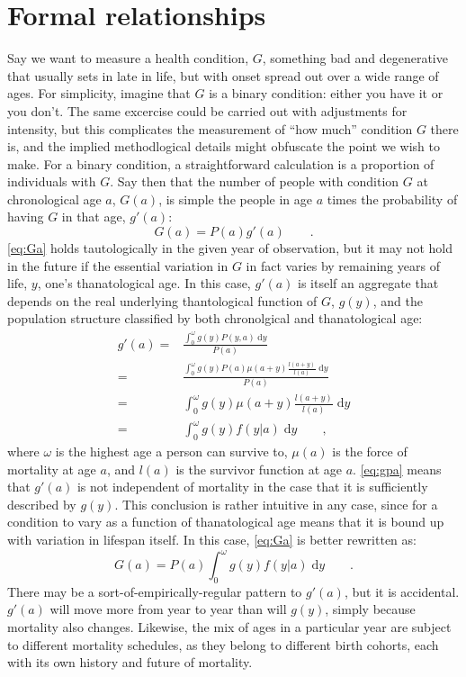 \documentclass[11pt,oneside,a4paper]{article} %
\newcommand{\dd}{\; \mathrm{d}}
\newcommand{\tc}{\quad\quad\text{,}}
\newcommand{\tp}{\quad\quad\text{.}}
\begin{document}
\section*{Formal relationships}
Say we want to measure a health condition, $G$, something bad and degenerative
that usually sets in late in life, but with onset spread out over a wide range
of ages. For simplicity, imagine that $G$ is a binary condition: either you have
it or you don't. The same excercise could be carried out with adjustments for
intensity, but this complicates the measurement of ``how much'' condition $G$
there is, and the implied methodlogical details might obfuscate the point we
wish to make. For a binary condition, a straightforward calculation is a
proportion of individuals with $G$. Say then that the number of people
with condition $G$ at chronological age $a$, $G(a)$, is simple the people in age
$a$ times the probability of having $G$ in that age, $g'(a)$:
\begin{equation}
\label{eq:Ga}
G(a) = P(a)  g'(a) \tp
\end{equation}
\eqref{eq:Ga} holds tautologically in the given year of observation, but it may
not hold in the future if the essential variation in $G$ in fact varies by
remaining years of life, $y$, one's thanatological age. In this case, $g'(a)$ is
itself an aggregate that depends on the real underlying thantological function
of $G$, $g(y)$, and the population structure classified by both chronolgical and
thanatological age:
\begin{align}
\label{eq:gpa}
g'(a) =& \frac{\int _0^\omega g(y)  P(y,a) \dd y}{P(a)} \\
  =& \frac{\int _0^\omega g(y)  P(a) \mu(a+y)\frac{l(a+y)}{l(a)}\dd y}{P(a)}\\
  =& \int _0^\omega g(y) \mu(a+y)\frac{l(a+y)}{l(a)}\dd y \\
  =& \int _0^\omega g(y) f(y|a)\dd y \tc
\end{align}
where $\omega$ is the highest age a person can survive to,
$\mu(a)$ is the force of mortality at age $a$, and $l(a)$ is the
survivor function at age $a$. \eqref{eq:gpa} means that $g'(a)$ is not
independent of mortality in the case that it is sufficiently described by
$g(y)$. This conclusion is rather intuitive in any case, since for a condition
to vary as a function of thanatological age means that it is bound up with
variation in lifespan itself. In this case, \eqref{eq:Ga} is better rewritten
as:
\begin{equation}
G(a) = P(a) \int _0^\omega g(y) f(y|a)\dd y \tp
\end{equation}
There may be a sort-of-empirically-regular pattern to $g'(a)$, but it is
accidental. $g'(a)$ will move more from year to year than will $g(y)$, simply
because mortality also changes. Likewise, the mix of ages in a
particular year are subject to different mortality schedules, as they belong to
different birth cohorts, each with its own history and future of mortality.
\end{document}
